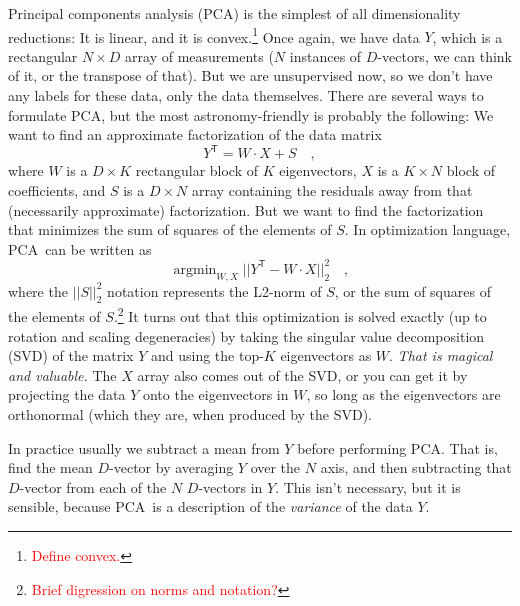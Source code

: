 \documentclass[12pt, twoside, letterpaper]{article}
\newcommand{\acronym}[1]{{\small{#1}}}
\newcommand{\PCA}{\acronym{PCA}}
\newcommand{\SVD}{\acronym{SVD}}
\newcommand{\todo}[1]{\textcolor{red}{#1}}  %
\newcommand{\T}{^{\mathsf{T}}}
\DeclareMathOperator*{\argmin}{argmin}
\begin{document}
Principal components analysis (\PCA) is the simplest of all dimensionality
reductions: It is linear, and it is convex.\footnote{\todo{Define convex.}}
Once again, we have data $Y$, which is a rectangular $N\times D$ array of
measurements ($N$ instances of $D$-vectors, we can think of it, or the transpose
of that).
But we are unsupervised now, so we don't have any labels for these data, only
the data themselves.
There are several ways to formulate \PCA, but the most astronomy-friendly
is probably the following:
We want to find an approximate factorization of the data matrix
\begin{equation}
Y\T = W \cdot X + S
\quad ,
\end{equation}
where $W$ is a $D\times K$ rectangular block of $K$ eigenvectors,
$X$ is a $K\times N$ block of coefficients,
and $S$ is a $D\times N$ array containing the residuals away from that
(necessarily approximate) factorization.
But we want to find the factorization that minimizes 
the sum of squares of the elements of $S$.
In optimization language, \PCA\ can be written as
\begin{equation}\label{eq:pcaopt}
\argmin_{W, X} ||Y\T - W \cdot X||_2^2
\quad ,
\end{equation}
where the $||S||_2^2$ notation represents the L2-norm of $S$, or the sum of squares
of the elements of $S$.\footnote{\todo{Brief digression on norms and notation?}}
It turns out that this optimization is solved exactly (up to rotation and scaling
degeneracies) by taking the singular value decomposition (\SVD) of the matrix $Y$
and using the top-$K$ eigenvectors as $W$.
\emph{That is magical and valuable.}
The $X$ array also comes out of the \SVD, or you can get it by projecting the
data $Y$ onto
the eigenvectors in $W$, so long as the eigenvectors are orthonormal (which they
are, when produced by the \SVD).

In practice usually we subtract a mean from $Y$ before performing \PCA.
That is, find the mean $D$-vector by averaging $Y$ over the $N$ axis,
and then subtracting that $D$-vector from each of the $N$ $D$-vectors
in $Y$.
This isn't necessary, but it is sensible, because \PCA\ is a description
of the \emph{variance} of the data $Y$.
\end{document}
